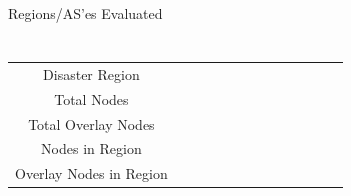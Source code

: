 \documentclass[pdftex]{beamer}
\begin{document}
\begin{frame}{Regions/AS'es Evaluated}
\begin{columns}
\begin{column}{\textwidth}
\begin{table}
\centering
\label{TABLE}
\caption{}
\begin{tabular}{|c|c|c|c|c|l|l|l|l|l|l|l|l|}
  \hline
   &  &  &  &  &  &  &  \\
  \hline
  Disaster Region         &  &  &  &  &  &  &  \\
  \hline
  Total Nodes             &  &  &  &  &  &  &  \\
  \hline
  Total Overlay Nodes     &  &  &  &  &  &  &  \\
  \hline
  Nodes in Region         &  &  &  &  &  &  &  \\
  \hline
  Overlay Nodes in Region &  &  &  &  &  &  &  \\
  \hline
\end{tabular}
\end{table}
\end{column}
\end{columns}
\end{frame}

\end{document}
